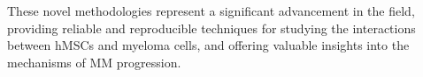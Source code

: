 These novel methodologies represent a significant advancement in the field,
providing reliable and reproducible techniques for studying the interactions
between hMSCs and myeloma cells, and offering valuable insights into the
mechanisms of MM progression.









